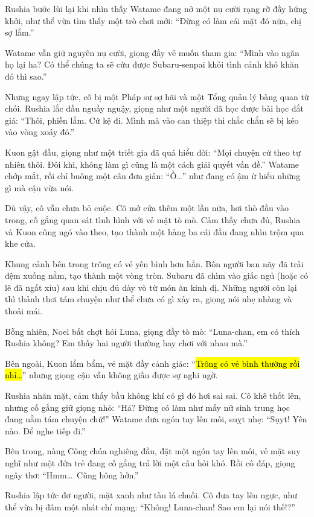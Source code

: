\documentclass[../main.tex]{subfiles}
\begin{document}
Rushia bước lùi lại khi nhìn thấy Watame đang nở một nụ cười rạng rỡ đầy hứng khởi, như thể vừa tìm thấy một trò chơi mới: ``Đừng có làm cái mặt đó nữa, chị sợ lắm.''

Watame vẫn giữ nguyên nụ cười, giọng đầy vẻ muốn tham gia: ``Mình vào ngăn họ lại ha? Có thể chúng ta sẽ cứu được Subaru-senpai khỏi tình cảnh khó khăn đó thì sao.''

Nhưng ngay lập tức, cô bị một Pháp sư sợ hãi và một Tổng quản lý bàng quan từ chối. Rushia lắc đầu nguầy nguậy, giọng như một người đã học được bài học đắt giá: ``Thôi, phiền lắm. Cứ kệ đi. Mình mà vào can thiệp thì chắc chắn sẽ bị kéo vào vòng xoáy đó.''

Kuon gật đầu, giọng như một triết gia đã quá hiểu đời: ``Mọi chuyện cứ theo tự nhiên thôi. Đôi khi, không làm gì cũng là một cách giải quyết vấn đề.'' Watame chớp mắt, rồi chỉ buông một câu đơn giản: ``Ồ\dots'' như đang có ậm ừ hiểu những gì mà cậu vừa nói.

Dù vậy, cô vẫn chưa bỏ cuộc. Cô mở cửa thêm một lần nữa, hơi thò đầu vào trong, cố gắng quan sát tình hình với vẻ mặt tò mò. Cảm thấy chưa đủ, Rushia và Kuon cũng ngó vào theo, tạo thành một hàng ba cái đầu đang nhìn trộm qua khe cửa.

Khung cảnh bên trong trông có vẻ yên bình hơn hẳn. Bốn người ban nãy đã trải đệm xuống nằm, tạo thành một vòng tròn. Subaru đã chìm vào giấc ngủ (hoặc có lẽ đã ngất xỉu) sau khi chịu đủ dày vò từ món ăn kinh dị. Những người còn lại thì thảnh thơi tám chuyện như thể chưa có gì xảy ra, giọng nói nhẹ nhàng và thoải mái.


Bỗng nhiên, Noel bất chợt hỏi Luna, giọng đầy tò mò: ``Luna-chan, em có thích Rushia không? Em thấy hai người thường hay chơi với nhau mà.''

Bên ngoài, Kuon lẩm bẩm, vẻ mặt đầy cảnh giác: ``\hl{Trông có vẻ bình thường rồi nhỉ\dots}'' nhưng giọng cậu vẫn không giấu được sự nghi ngờ.

Rushia nhăn mặt, cảm thấy bầu không khí có gì đó hơi sai sai. Cô khẽ thốt lên, nhưng cố gắng giữ giọng nhỏ: ``Hả? Đừng có làm như mấy nữ sinh trung học đang nằm tám chuyện chứ!'' Watame đưa ngón tay lên môi, suỵt nhẹ: ``Sụyt! Yên nào. Để nghe tiếp đi.''

Bên trong, nàng Công chúa nghiêng đầu, đặt một ngón tay lên môi, vẻ mặt suy nghĩ như một đứa trẻ đang cố gắng trả lời một câu hỏi khó. Rồi cô đáp, giọng ngây thơ: ``Hmm\dots\ Cũng hông hởn.''

Rushia lập tức đơ người, mặt xanh như tàu lá chuối. Cô đưa tay lên ngực, như thể vừa bị đâm một nhát chí mạng: ``Không! Luna-chan! Sao em lại nói thế!?''
\end{document}

